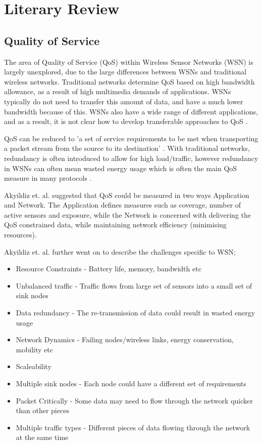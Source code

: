 \section{Literary Review}

\subsection{Quality of Service}
The area of Quality of Service (QoS) within Wireless Sensor Networks (WSN) is largely unexplored, due to the large differences between WSNs and traditional wireless networks. Traditional networks determine QoS based on high bandwidth allowance, as a result of high multimedia demands of applications. WSNs typically do not need to transfer this amount of data, and have a much lower bandwidth because of this. WSNs also have a wide range of different applications, and as a result, it is not clear how to develop transferable approaches to QoS  \cite{Akyildiz2002393}. 

QoS can be reduced to 'a set of service requirements to be met when transporting a packet stream from the source to its destination' \cite{Crawley98aframework}. With traditional networks, redundancy is often introduced to allow for high load/traffic, however redundancy in WSNs can often mean wasted energy usage which is often the main QoS measure in many protocols \cite{AkkayaYounis2003}.

Akyildiz et. al. \cite{Akyildiz2002393} suggested that QoS could be measured in two ways Application and Network. The Application defines measures such as coverage, number of active sensors and exposure, while the Network is concerned with delivering the QoS constrained data, while maintaining network efficiency (minimising resources).

Akyildiz et. al. further went on to describe the challenges specific to WSN; 
\begin{itemize}  
			\item Resource Constraints - Battery life, memory, bandwidth etc
			\item Unbalanced traffic - Traffic flows from large set of sensors into a small set of sink nodes
			\item Data redundancy - The re-transmission of data could result in wasted energy usage
			\item Network Dynamics - Failing nodes/wireless links, energy conservation, mobility etc
			\item Scaleability 
			\item Multiple sink nodes - Each node could have a different set of requirements
			\item Packet Critically - Some data may need to flow through the network quicker than other pieces
			\item Multiple traffic types - Different pieces of data flowing through the network at the same time
\end{itemize}

